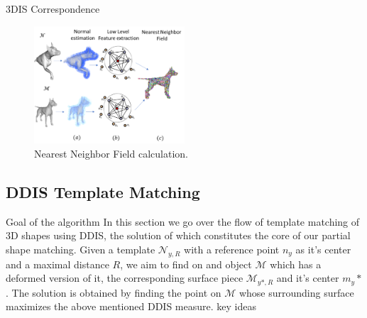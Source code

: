 \documentclass[10pt,twocolumn,letterpaper]{article}
\begin{document}
\begin{algorithm}
	\caption{3DIS Correspondence}
	\begin{algorithmic}
		 
		\EndIf
		\EndFor
		\EndProcedure
	\end{algorithmic}
\end{algorithm}

\begin{figure}[htb]
	\includegraphics[width=0.5\textwidth]{figures/NNF.png}
	\caption{Nearest Neighbor Field calculation.}
\end{figure}

\subsection{DDIS Template Matching}
{\color{red} Goal of the algorithm}
In this section we go over the flow of template matching of 3D shapes using DDIS, the solution of which constitutes the core of our partial shape matching. Given a template $\mathcal{N}_{y,R}$ with a reference point $n_y$ as it's center and a maximal distance $R$, we aim to find on and object $\mathcal{M}$ which has a deformed version of it, the corresponding surface piece $\mathcal{M}_{y*,R}$ and it's center $m_y*$. The solution is obtained by finding the point on $\mathcal{M}$ whose surrounding surface maximizes the above mentioned DDIS measure.
{\color{red}key ideas}
\end{document}
